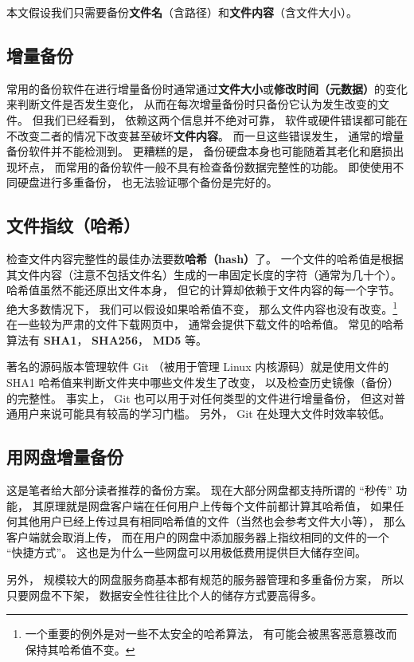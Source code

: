 本文假设我们只需要备份\textbf{文件名}（含路径）和\textbf{文件内容}（含文件大小）。

\subsection{增量备份}
常用的备份软件在进行增量备份时通常通过\textbf{文件大小}或\textbf{修改时间（元数据）}的变化来判断文件是否发生变化， 从而在每次增量备份时只备份它认为发生改变的文件。 但我们已经看到， 依赖这两个信息并不绝对可靠， 软件或硬件错误都可能在不改变二者的情况下改变甚至破坏\textbf{文件内容}。 而一旦这些错误发生， 通常的增量备份软件并不能检测到。 更糟糕的是， 备份硬盘本身也可能随着其老化和磨损出现坏点， 而常用的备份软件一般不具有检查备份数据完整性的功能。 即使使用不同硬盘进行多重备份， 也无法验证哪个备份是完好的。

\subsection{文件指纹（哈希）}
检查文件内容完整性的最佳办法要数\textbf{哈希（hash）}了。 一个文件的哈希值是根据其文件内容（注意不包括文件名）生成的一串固定长度的字符（通常为几十个）。 哈希值虽然不能还原出文件本身， 但它的计算却依赖于文件内容的每一个字节。 绝大多数情况下， 我们可以假设如果哈希值不变， 那么文件内容也没有改变。\footnote{一个重要的例外是对一些不太安全的哈希算法， 有可能会被黑客恶意篡改而保持其哈希值不变。}在一些较为严肃的文件下载网页中， 通常会提供下载文件的哈希值。 常见的哈希算法有 \textbf{SHA1}， \textbf{SHA256}， \textbf{MD5} 等。

著名的源码版本管理软件 Git （被用于管理 Linux 内核源码）就是使用文件的 SHA1 哈希值来判断文件夹中哪些文件发生了改变， 以及检查历史镜像（备份）的完整性。 事实上， Git 也可以用于对任何类型的文件进行增量备份， 但这对普通用户来说可能具有较高的学习门槛。 另外， Git 在处理大文件时效率较低。

\subsection{用网盘增量备份}
这是笔者给大部分读者推荐的备份方案。 现在大部分网盘都支持所谓的 “秒传” 功能， 其原理就是网盘客户端在任何用户上传每个文件前都计算其哈希值， 如果任何其他用户已经上传过具有相同哈希值的文件（当然也会参考文件大小等）， 那么客户端就会取消上传， 而在用户的网盘中添加服务器上指纹相同的文件的一个 “快捷方式”。 这也是为什么一些网盘可以用极低费用提供巨大储存空间。

另外， 规模较大的网盘服务商基本都有规范的服务器管理和多重备份方案， 所以只要网盘不下架， 数据安全性往往比个人的储存方式要高得多。

